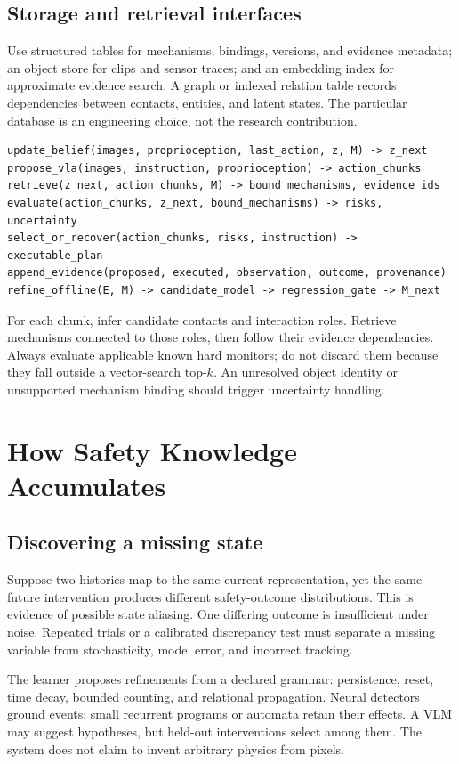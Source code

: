 \documentclass[10pt]{article}
\begin{document}
\subsection{Storage and retrieval interfaces}
Use structured tables for mechanisms, bindings, versions, and evidence metadata; an object store for clips and sensor traces; and an embedding index for approximate evidence search. A graph or indexed relation table records dependencies between contacts, entities, and latent states. The particular database is an engineering choice, not the research contribution.

\begin{lstlisting}
update_belief(images, proprioception, last_action, z, M) -> z_next
propose_vla(images, instruction, proprioception) -> action_chunks
retrieve(z_next, action_chunks, M) -> bound_mechanisms, evidence_ids
evaluate(action_chunks, z_next, bound_mechanisms) -> risks, uncertainty
select_or_recover(action_chunks, risks, instruction) -> executable_plan
append_evidence(proposed, executed, observation, outcome, provenance)
refine_offline(E, M) -> candidate_model -> regression_gate -> M_next
\end{lstlisting}

For each chunk, infer candidate contacts and interaction roles. Retrieve mechanisms connected to those roles, then follow their evidence dependencies. Always evaluate applicable known hard monitors; do not discard them because they fall outside a vector-search top-$k$. An unresolved object identity or unsupported mechanism binding should trigger uncertainty handling.

\newpage
\section{How Safety Knowledge Accumulates}
\subsection{Discovering a missing state}
Suppose two histories map to the same current representation, yet the same future intervention produces different safety-outcome distributions. This is evidence of possible state aliasing. One differing outcome is insufficient under noise. Repeated trials or a calibrated discrepancy test must separate a missing variable from stochasticity, model error, and incorrect tracking.

The learner proposes refinements from a declared grammar: persistence, reset, time decay, bounded counting, and relational propagation. Neural detectors ground events; small recurrent programs or automata retain their effects. A VLM may suggest hypotheses, but held-out interventions select among them. The system does not claim to invent arbitrary physics from pixels.
\end{document}
